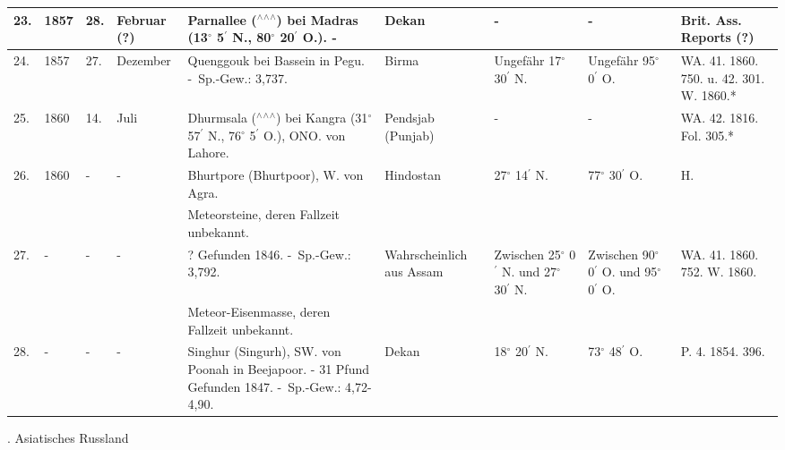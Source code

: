 \documentclass[a4paper, 11pt, oneside, polutonikogreek, german]{article}
\begin{document}
\begin{table}[!ht]
\begin{tabular}{|l|l|l|l|l|l|l|l|l|}
        23. & 1857 & 28. & Februar (?) & Parnallee ($^\wedge$$^\wedge$$^\wedge$) bei Madras (13$^\circ$ 5$^\prime$ N., 80$^\circ$ 20$^\prime$ O.). - & Dekan & - & - & Brit. Ass. Reports (?) \\ \hline
        24. & 1857 & 27. & Dezember & Quenggouk bei Bassein in Pegu. - Sp.-Gew.: 3,737. & Birma & Ungefähr 17$^\circ$ 30$^\prime$ N. & Ungefähr 95$^\circ$ 0$^\prime$ O. & WA. 41. 1860. 750. u. 42. 301. W. 1860.* \\ \hline
        25. & 1860 & 14. & Juli & Dhurmsala ($^\wedge$$^\wedge$$^\wedge$) bei Kangra (31$^\circ$ 57$^\prime$ N., 76$^\circ$ 5$^\prime$ O.), ONO. von Lahore. & Pendsjab (Punjab) & - & - & WA. 42. 1816. Fol. 305.* \\ \hline
        26. & 1860 & - & - & Bhurtpore (Bhurtpoor), W. von Agra. & Hindostan & 27$^\circ$ 14$^\prime$ N. & 77$^\circ$ 30$^\prime$ O. & H. \\ \hline
          &   &   &   & Meteorsteine, deren Fallzeit unbekannt. &   &   &   & ~ \\ \hline
        27. & - & - & - & ? Gefunden 1846. - Sp.-Gew.: 3,792. & Wahrscheinlich aus Assam & Zwischen 25$^\circ$ 0$^\prime$ N. und 27$^\circ$ 30$^\prime$ N. & Zwischen 90$^\circ$ 0$^\prime$ O. und 95$^\circ$ 0$^\prime$ O. & WA. 41. 1860. 752. W. 1860. \\ \hline
          &   &   &   & Meteor-Eisenmasse, deren Fallzeit unbekannt. &   &   &   &   \\ \hline
        28. & - & - & - & Singhur (Singurh), SW. von Poonah in Beejapoor. - 31 Pfund Gefunden 1847. - Sp.-Gew.: 4,72-4,90. & Dekan & 18$^\circ$ 20$^\prime$ N. & 73$^\circ$ 48$^\prime$ O. & P. 4. 1854. 396. \\ \hline
    \end{tabular}
\end{table}
. Asiatisches Russland
\end{document}
